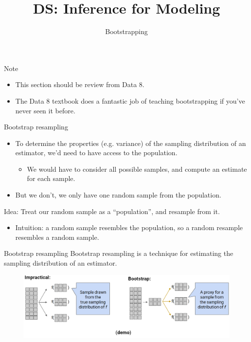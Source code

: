 \documentclass[aspectratio=169]{../latex_main/tntbeamer}  %
\title[Introduction]{DS: Inference for Modeling}
\subtitle{Bootstrapping}
\begin{document}
	
	\maketitle
	\begin{frame}{Note}
	    \begin{itemize}
	        \item This section should be review from Data 8.
	        \item The Data 8 textbook does a fantastic job of teaching bootstrapping if you’ve never seen it before.
	    \end{itemize}
	\end{frame}
	
	\begin{frame}{Bootstrap resampling}
	    \begin{itemize}
	        \item To determine the properties (e.g. variance) of the sampling distribution of an estimator, we’d need to have access to the population.
	        \begin{itemize}
	            \item We would have to consider all possible samples, and compute an estimate for each sample.
	        \end{itemize}
	        \item But we don’t, we only have one random sample from the population.
	    \end{itemize}
	    \bigskip
	    Idea: Treat our random sample as a “population”, and resample from it.
	    \begin{itemize}
	        \item Intuition: a random sample resembles the population, so a random resample resembles a random sample.
	    \end{itemize}
	\end{frame}
	
	
	\begin{frame}{Bootstrap resampling}
	    Bootstrap resampling is a technique for estimating the sampling distribution of an estimator.
	    \begin{figure}
	        \centering
	        \includegraphics[scale=.4]{Bild4}
	    \end{figure}
	\end{frame}
	
\end{document}

